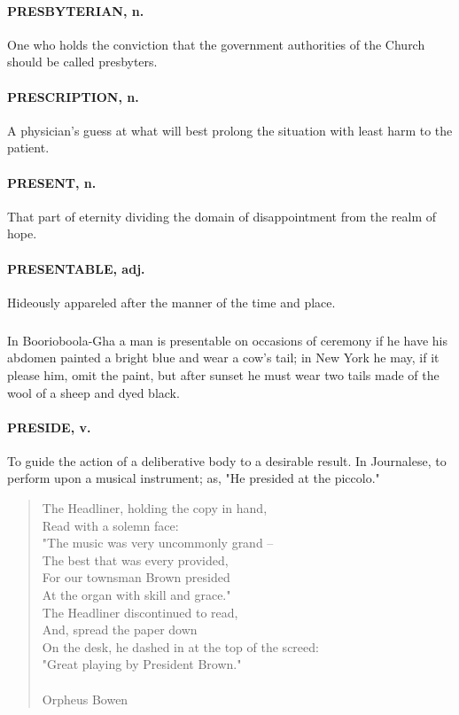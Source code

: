 \documentclass[11pt]{article}
\begin{document}
\paragraph{PRESBYTERIAN, n.}  One who holds the conviction that the government
authorities of the Church should be called presbyters.

\paragraph{PRESCRIPTION, n.}  A physician's guess at what will best prolong the
situation with least harm to the patient.

\paragraph{PRESENT, n.}  That part of eternity dividing the domain of
disappointment from the realm of hope.

\paragraph{PRESENTABLE, adj.}  Hideously appareled after the manner of the time
and place.
\subparagraph{}   In Boorioboola-Gha a man is presentable on occasions of ceremony
if he have his abdomen painted a bright blue and wear a cow's tail; in
New York he may, if it please him, omit the paint, but after sunset he
must wear two tails made of the wool of a sheep and dyed black.

\paragraph{PRESIDE, v.}  To guide the action of a deliberative body to a desirable
result.  In Journalese, to perform upon a musical instrument; as, "He
presided at the piccolo."

\begin{quote}   The Headliner, holding the copy in hand, \\
      Read with a solemn face: \\
  "The music was very uncommonly grand -- \\
          The best that was every provided, \\
          For our townsman Brown presided \\
      At the organ with skill and grace." \\
  The Headliner discontinued to read, \\
      And, spread the paper down \\
  On the desk, he dashed in at the top of the screed: \\
      "Great playing by President Brown." \\
 \\
Orpheus Bowen \end{quote}
\end{document}
